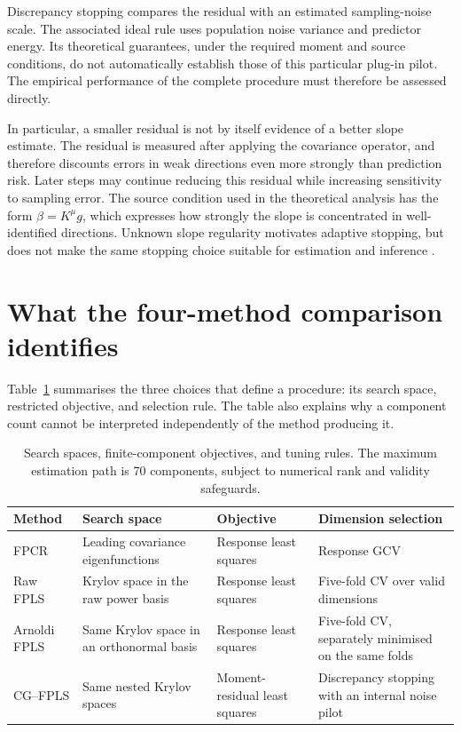 Discrepancy stopping compares the residual with an estimated sampling-noise
scale. The associated ideal rule uses population noise variance and
predictor energy. Its theoretical guarantees, under the required moment
and source conditions, do not automatically establish those of this
particular plug-in pilot. The empirical performance of the complete
procedure must therefore be assessed directly.

In particular, a smaller residual is not by itself evidence of a better
slope estimate. The residual is measured after applying the covariance
operator, and therefore discounts errors in weak directions even more
strongly than prediction risk. Later steps may continue reducing this
residual while increasing sensitivity to sampling error. The source
condition used in the theoretical analysis has the form $\beta=K^\mu g$,
which expresses how strongly the slope is concentrated in well-identified
directions. Unknown slope regularity motivates adaptive stopping, but does
not make the same stopping choice suitable for estimation and inference
\parencite{babii_carrasco_tsafack_2026}.

\section{What the four-method comparison identifies}

Table~\ref{main:tab:methods} summarises the three choices that define a
procedure: its search space, restricted objective, and selection rule.
The table also explains why a component count cannot be interpreted
independently of the method producing it.

\begin{table}[htbp]
 \centering
 \small
 \caption[The four complete estimation procedures]{Search spaces, finite-component
 objectives, and tuning rules. The maximum estimation path is 70 components,
 subject to numerical rank and validity safeguards.}
 \label{main:tab:methods}
 \begin{tabular}{@{}
 >{\raggedright\arraybackslash}p{1.8cm}
 >{\raggedright\arraybackslash}p{3.0cm}
 >{\raggedright\arraybackslash}p{3.2cm}
 >{\raggedright\arraybackslash}p{4.4cm}@{}}
 \toprule
 Method & Search space & Objective & Dimension selection \\
 \midrule
 FPCR & Leading covariance eigenfunctions & Response least squares
 & Response GCV \\
 Raw FPLS & Krylov space in the raw power basis & Response least squares
 & Five-fold CV over valid dimensions \\
 Arnoldi FPLS & Same Krylov space in an orthonormal basis & Response least squares
 & Five-fold CV, separately minimised on the same folds \\
 CG--FPLS & Same nested Krylov spaces & Moment-residual least squares
 & Discrepancy stopping with an internal noise pilot \\
 \bottomrule
 \end{tabular}
\end{table}

